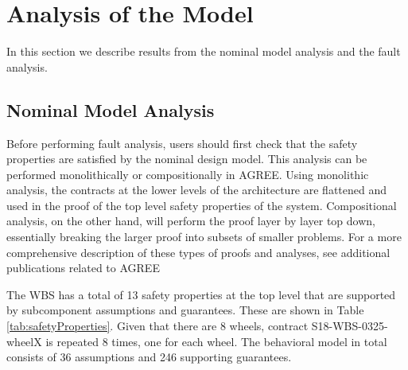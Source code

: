 \section{Analysis of the Model}
\label{sec:fault_analysis_2}
In this section we describe results from the nominal model analysis and the fault analysis.  

\subsection{Nominal Model Analysis}
Before performing fault analysis, users should first check that the safety properties are satisfied by the nominal design model. This analysis can be performed monolithically or compositionally in AGREE. Using monolithic analysis, the contracts at the lower levels of the architecture are flattened and used in the proof of the top level safety properties of the system. Compositional analysis, on the other hand, will perform the proof layer by layer top down, essentially breaking the larger proof into subsets of smaller problems. For a more comprehensive description of these types of proofs and analyses, see additional publications related to AGREE \cite{cofer2012compositional,QFCS15:backes} 

The WBS has a total of 13 safety properties at the top level that are supported by subcomponent assumptions and guarantees. These are shown in Table \ref{tab:safetyProperties}. Given that there are 8 wheels, contract S18-WBS-0325-wheelX is repeated 8 times, one for each wheel. The behavioral model in total consists of 36 assumptions and 246 supporting guarantees.

